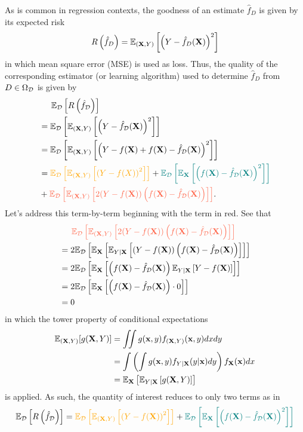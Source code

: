 \documentclass[11pt]{article}
\begin{document}
As is common in regression contexts, the goodness of an estimate $\hat{f}_D$ is given by its expected risk
$$
R\left(\hat{f}_D\right)
=
\mathbb{E}_{(\mathbf{X},Y)}\left[\left(Y-\hat{f}_D(\mathbf{X})\right)^2\right]
$$
in which mean square error (MSE) is used as loss. Thus, the quality of the corresponding estimator (or learning algorithm) used to determine $\hat{f}_{D}$ from $D\in\Omega_{\mathcal{D}}$ is given by
\begin{align*}
    &\hspace{14.52pt}
    \E_{\D}\l[R\l(\hat{f}_{\D}\r)\r]\\
    &=
    \E_{\D}\l[\E_{(\X,Y)}\l[\l(Y-\hat{f}_{\D}(\X)\r)^2\r]\r]\nonumber\\
    &=
    \E_{\D}\l[\E_{(\X,Y)}\l[\l(Y-f(\X)+f(\X)-\hat{f}_{\D}(\X)\r)^2\r]\r]\nonumber\\
    &=
    \textcolor{myYellow}{\E_{\D}\l[\E_{(\X,Y)}\l[\l(Y-f(X)\r)^2\r]\r]}+
    \textcolor{myGreen}{\E_{\D}\l[\E_\X\l[\l(f(\X)-\hat{f}_{\D}(\X)\r)^2\r]\r]}\\
    &+\textcolor{myLightRed}{\E_{\D}\l[\E_{(\X,Y)}\l[2(Y-f(\X))\l(f(\X)-\hat{f}_{\D}(\X)\r)\r]\r]}.
\end{align*}
Let's address this term-by-term beginning with the term in red. See that
\begin{align*}
    &\hspace{14.52pt}
    \textcolor{myLightRed}{\E_{\D}\l[\E_{(\X,Y)}\l[2(Y-f(\X))\l(f(\X)-\hat{f}_{\D}(\X)\r)\r]\r]}\\
    &=
    2\E_{\D}\l[\E_\X\l[\E_{Y|\X}\l[(Y-f(\X))\l(f(\X)-\hat{f}_{\D}(\X)\r)\r]\r]\r]\\
    &=
    2\E_{\D}\l[\E_\X\l[\l(f(\X)-\hat{f}_{\D}(\X)\r)\E_{Y|\X}\l[Y-f(\X)\r]\r]\r]\\
    &=
    2\E_{\D}\l[\E_\X\l[\l(f(\X)-\hat{f}_{\D}(\X)\r)\cdot0\r]\r]\\
    &=
    0
\end{align*}
in which the tower property of conditional expectations
\begin{align*}
    \mathbb{E}_{(\mathbf{X},Y)}[g(\mathbf{X},Y)]
    &=
    \iint g(\mathbf{x},y)f_{(\mathbf{X},Y)}(\mathbf{x},y)dxdy\\
    &=
    \int \left(\int g(\mathbf{x},y)f_{Y|\mathbf{X}}(y|\mathbf{x})dy\right)f_{\mathbf{X}}(\mathbf{x})dx\\
    &=
    \mathbb{E}_{\mathbf{X}}\left[\mathbb{E}_{Y|\mathbf{X}}\left[g(\mathbf{X},Y)\right]\right]
\end{align*}
is applied. As such, the quantity of interest reduces to only two terms as in
$$
\E_{\D}\l[R\l(\hat{f}_{\D}\r)\r]
=
\textcolor{myYellow}{\E_{\D}\l[\E_{(\X,Y)}\l[\l(Y-f(\X)\r)^2\r]\r]}+\textcolor{myGreen}{\E_{\D}\l[\E_\X\l[\l(f(\X)-\hat{f}_{\D}(\X)\r)^2\r]\r]}
$$
\end{document}
